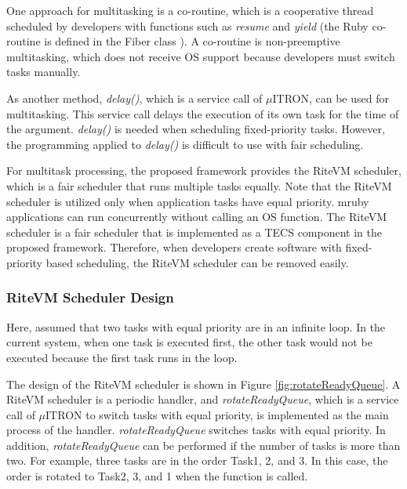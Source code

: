 \documentclass[conference]{IEEEtran/IEEEtran/IEEEtran}
\begin{document}
One approach for multitasking is a co-routine, which is a cooperative thread scheduled by developers with functions such as {\it resume} and {\it yield} (the Ruby co-routine is defined in the Fiber class \cite{url:co-routine}).
A co-routine is non-preemptive multitasking, which does not receive OS support because developers must switch tasks manually.

As another method, {\it delay()}, which is a service call of $\mu$ITRON, can be used for multitasking.
This service call delays the execution of its own task for the time of the argument.
{\it delay()} is needed when scheduling fixed-priority tasks.
However, the programming applied to {\it delay()} is difficult to use with fair scheduling.

For multitask processing, the proposed framework provides the RiteVM scheduler, which is a fair scheduler that runs multiple tasks equally.
Note that the RiteVM scheduler is utilized only when application tasks have equal priority.
mruby applications can run concurrently without calling an OS function.
The RiteVM scheduler is a fair scheduler that is implemented as a TECS component in the proposed framework.
Therefore, when developers create software with fixed-priority based scheduling, the RiteVM scheduler can be removed easily.


\subsubsection{RiteVM Scheduler Design}
Here, assumed that two tasks with equal priority are in an infinite loop.
 In the current system, when one task is executed first, the other task would not be executed because the first task runs in the loop.

The design of the RiteVM scheduler is shown in Figure \ref{fig:rotateReadyQueue}. 
A RiteVM scheduler is a periodic handler, and {\it rotateReadyQueue}, which is a service call of $\mu$ITRON to switch tasks with equal priority, is implemented as the main process of the handler.
{\it rotateReadyQueue} switches tasks with equal priority.
In addition, {\it rotateReadyQueue} can be performed if the number of tasks is more than two.
For example, three tasks are in the order Task1, 2, and 3.
In this case, the order is rotated to Task2, 3, and 1 when the function is called.
\end{document}
